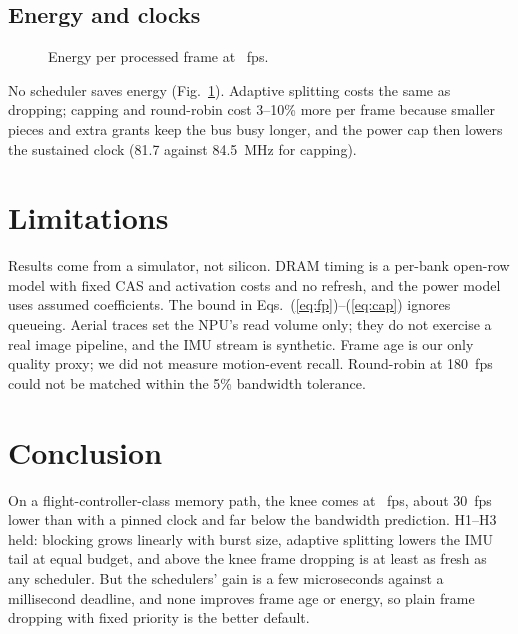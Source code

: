 \documentclass[conference]{IEEEtran}
\begin{document}
\subsection{Energy and clocks}
\begin{figure}[t]\centering\caption{Energy per processed frame at \policyFps{}~fps.}\label{fig:energy}\end{figure}
No scheduler saves energy (Fig.~\ref{fig:energy}). Adaptive splitting costs the same as dropping; capping and round-robin cost 3--10\% more per frame because smaller pieces and extra grants keep the bus busy longer, and the power cap then lowers the sustained clock (81.7 against 84.5~MHz for capping).

\section{Limitations}
Results come from a simulator, not silicon. DRAM timing is a per-bank open-row model with fixed CAS and activation costs and no refresh, and the power model uses assumed coefficients. The bound in Eqs.~(\ref{eq:fp})--(\ref{eq:cap}) ignores queueing. Aerial traces set the NPU's read volume only; they do not exercise a real image pipeline, and the IMU stream is synthetic. Frame age is our only quality proxy; we did not measure motion-event recall. Round-robin at 180~fps could not be matched within the 5\% bandwidth tolerance.

\section{Conclusion}
On a flight-controller-class memory path, the knee comes at \kneeFps{}~fps, about 30~fps lower than with a pinned clock and far below the bandwidth prediction. H1--H3 held: blocking grows linearly with burst size, adaptive splitting lowers the IMU tail at equal budget, and above the knee frame dropping is at least as fresh as any scheduler. But the schedulers' gain is a few microseconds against a millisecond deadline, and none improves frame age or energy, so plain frame dropping with fixed priority is the better default.



\end{document}

